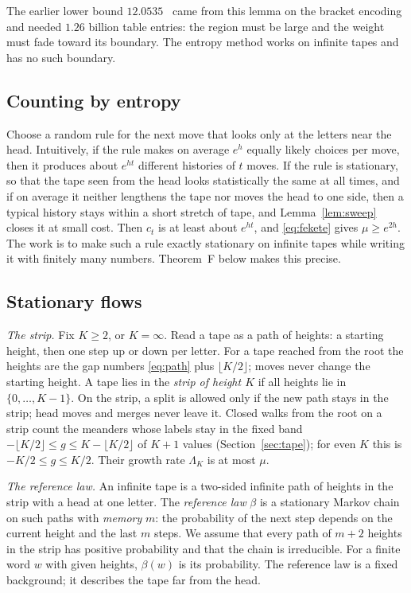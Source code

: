 The earlier lower bound $12.0535$~\cite{BoundsPaper} came from this lemma on the bracket encoding and needed $1.26$
billion table entries: the region must be large and the weight must fade toward its boundary. The entropy method
works on infinite tapes and has no such boundary.

\subsection{Counting by entropy}

Choose a random rule for the next move that looks only at the letters near the head. Intuitively, if the rule makes
on average $e^h$ equally likely choices per move, then it produces about $e^{ht}$ different histories of $t$ moves. If
the rule is stationary, so that the tape seen from the head looks statistically the same at all times, and if on
average it neither lengthens the tape nor moves the head to one side, then a typical history stays within a short
stretch of tape, and Lemma~\ref{lem:sweep} closes it at small cost. Then $c_t$ is at least about $e^{ht}$, and
\eqref{eq:fekete} gives $\mu\ge e^{2h}$. The work is to make such a rule exactly stationary on infinite tapes while
writing it with finitely many numbers. Theorem~F below makes this precise.

\subsection{Stationary flows}

\emph{The strip.} Fix $K\ge2$, or $K=\infty$. Read a tape as a path of heights: a starting height, then one step
up or down per letter. For a tape reached from the root the heights are the gap numbers \eqref{eq:path} plus
$\lfloor K/2\rfloor$; moves never change the starting height. A tape lies in the \emph{strip of height $K$} if all
heights lie in $\{0,\ldots,K-1\}$. On the strip, a split is allowed only if the new path stays in the strip; head
moves and merges never leave it. Closed walks from the root on a strip count the meanders whose labels stay in the
fixed band $-\lfloor K/2\rfloor\le g\le K-\lfloor K/2\rfloor$ of $K+1$ values (Section~\ref{sec:tape}); for even
$K$ this is $-K/2\le g\le K/2$. Their growth rate $\Lambda_K$ is at most $\mu$.

\emph{The reference law.} An infinite tape is a two-sided infinite path of heights in the strip with a head at one
letter. The \emph{reference law} $\beta$ is a stationary Markov chain on such paths with \emph{memory} $m$: the
probability of the next step depends on the current height and the last $m$ steps. We assume that every path of $m+2$
heights in the strip has positive probability and that the chain is irreducible. For a finite word $w$ with given
heights, $\beta(w)$ is its probability. The reference law is a fixed background; it describes the tape far from the
head.

